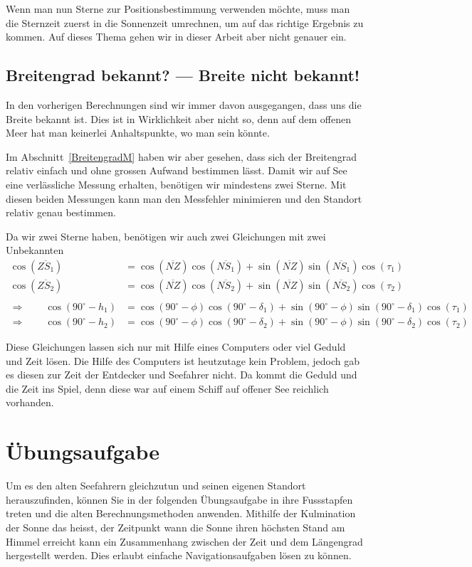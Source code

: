 \begin{refsection}
Wenn man nun Sterne zur Positionsbestimmung verwenden möchte, muss
man die Sternzeit zuerst in die Sonnenzeit umrechnen, um auf das
richtige Ergebnis zu kommen. Auf dieses Thema gehen wir in dieser
Arbeit aber nicht genauer ein.


\subsection{Breitengrad bekannt? --- Breite nicht bekannt!}
In den vorherigen Berechnungen sind wir immer davon ausgegangen,
dass uns die Breite bekannt ist. Dies ist in Wirklichkeit aber nicht
so, denn auf dem offenen Meer hat man keinerlei Anhaltspunkte, wo
man sein könnte.

Im Abschnitt~\ref{BreitengradM}  haben wir
aber gesehen, dass sich der Breitengrad relativ einfach und ohne
grossen Aufwand bestimmen lässt. Damit wir auf See eine verlässliche
Messung erhalten, benötigen wir mindestens zwei Sterne. Mit diesen
beiden Messungen kann man den Messfehler minimieren und den Standort
relativ genau bestimmen.

Da wir zwei Sterne haben, benötigen wir auch zwei Gleichungen mit
zwei Unbekannten
\begin{align*}
\cos(\overline{ZS_1}) &= \cos(\overline{NZ}) \cos(\overline{NS_1}) + \sin(\overline{NZ}) \sin(\overline{NS_1}) \cos(\tau_1) \\
\cos(\overline{ZS_2}) &= \cos(\overline{NZ}) \cos(\overline{NS_2}) + \sin(\overline{NZ}) \sin(\overline{NS_2}) \cos(\tau_2) \\
\\
\Rightarrow \quad \quad
\cos(90^{\circ} - h_1) &= \cos(90^{\circ} - \phi) \cos(90^{\circ} - \delta_1) + \sin(90^{\circ} - \phi)\sin(90^{\circ} - \delta_1) \cos(\tau_1) \\
\Rightarrow \quad \quad
\cos(90^{\circ} - h_2) &= \cos(90^{\circ} - \phi) \cos(90^{\circ} - \delta_2) + \sin(90^{\circ} - \phi)\sin(90^{\circ} - \delta_2) \cos(\tau_2)
\end{align*}

Diese Gleichungen lassen sich nur mit Hilfe eines Computers oder
viel Geduld und Zeit lösen. Die Hilfe des Computers ist heutzutage
kein Problem, jedoch gab es diesen zur Zeit der Entdecker und
Seefahrer nicht. Da kommt die Geduld und die Zeit ins Spiel, denn
diese war auf einem Schiff auf offener See reichlich vorhanden.


\section{Übungsaufgabe}
Um es den alten Seefahrern gleichzutun und seinen eigenen Standort
herauszufinden, können Sie in der folgenden Übungsaufgabe in ihre
Fussstapfen treten und die alten Berechnungsmethoden anwenden.
Mithilfe der Kulmination der Sonne das heisst, der Zeitpunkt wann
die Sonne ihren höchsten Stand am Himmel erreicht kann ein Zusammenhang
zwischen der Zeit und dem Längengrad hergestellt werden. Dies erlaubt
einfache Navigationsaufgaben lösen zu können.
\bigskip


\end{refsection}
